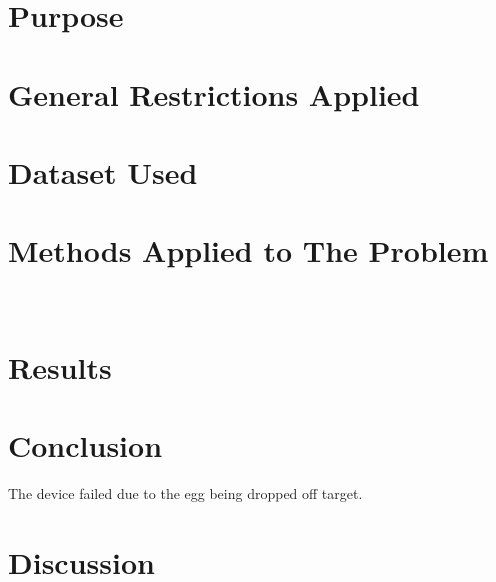 \documentclass[11pt]{article}
\begin{document}
\begin{page}
\section{Purpose}

\section{General Restrictions Applied}

\section{Dataset Used}


\section{Methods Applied to The Problem}

\\


\section{Results}


\section{Conclusion}
The device failed due to the egg being dropped off target.

\section{Discussion}

\end{page}
\end{document}

